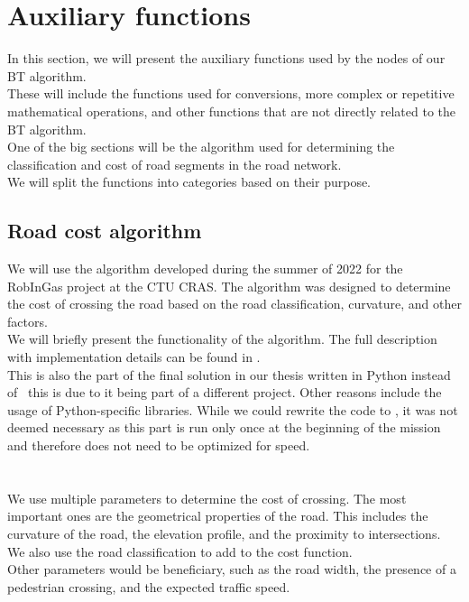 \section{Auxiliary functions}
    In this section, we will present the auxiliary functions used by the nodes of our BT algorithm.\\
    These will include the functions used for conversions, more complex or repetitive mathematical operations, and other functions that are not directly related to the BT algorithm.\\
    One of the big sections will be the algorithm used for determining the classification and cost of road segments in the road network.\\
    We will split the functions into categories based on their purpose.

    \subsection{Road cost algorithm}
        \label{sec:road_cost}
        We will use the algorithm developed during the summer of 2022 for the RobInGas project at the CTU CRAS. The algorithm was designed to determine the cost of crossing the road based on the road classification, curvature, and other factors.\\
        We will briefly present the functionality of the algorithm. The full description with implementation details can be found in \cite{Road_cost_docs}.\\
        This is also the part of the final solution in our thesis written in Python instead of \CC\ this is due to it being part of a different project. Other reasons include the usage of Python-specific libraries. While we could rewrite the code to \CC, it was not deemed necessary as this part is run only once at the beginning of the mission and therefore does not need to be optimized for speed.\\\\
        \\
            We use multiple parameters to determine the cost of crossing. The most important ones are the geometrical properties of the road. This includes the curvature of the road, the elevation profile, and the proximity to intersections. We also use the road classification to add to the cost function.\\
            Other parameters would be beneficiary, such as the road width, the presence of a pedestrian crossing, and the expected traffic speed.\\
